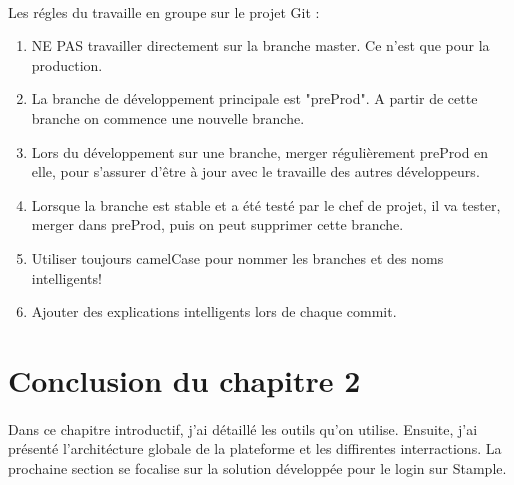 \paragraph{}
Les régles du travaille en groupe sur le projet Git :
\begin{enumerate}
\item NE PAS travailler directement sur la branche master. Ce n'est que pour la production.
\item La branche de développement principale est "preProd". A partir de cette branche on commence une nouvelle branche. 
\item Lors du développement sur une branche, merger régulièrement preProd en elle, pour s'assurer d'être à jour avec le travaille des autres développeurs.
\item Lorsque la branche est stable et a été testé par le chef de projet, il va tester, merger dans preProd, puis on peut supprimer cette branche.
\item Utiliser toujours camelCase pour nommer les branches et des noms intelligents!
\item Ajouter des explications intelligents lors de chaque commit.
\end{enumerate}
\section{Conclusion du chapitre 2}
\paragraph{}
Dans ce chapitre introductif, j'ai détaillé les outils qu'on utilise. Ensuite, j'ai présenté l'architécture globale de la plateforme et les diffirentes interractions. La prochaine section se focalise sur la solution développée pour le login sur Stample.
